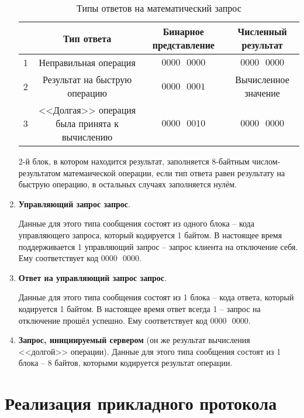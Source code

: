 \begin{enumerate}
	\begin{table}[H]
	\begin{center}
		\caption{Типы ответов на математический запрос}
		\label{tab:math-resp}
		\def\tabcolsep{4pt}
		\fontsize{10}{11}\selectfont
		\begin{tabular}{|c|c|c|c|}
			\hline 
			& Тип ответа & Бинарное представление & Численный результат \\ 
			\hline 
			1 & Неправильная операция & $0000\text{ }0000$ & $0000\text{ }0000$\\ 
			\hline 
			2 & Результат на быструю операцию & $0000\text{ }0001$ & Вычисленное значение\\ 
			\hline 
			3 & <<Долгая>> операция была принята к вычислению & $0000\text{ }0010$ & $0000\text{ }0000$\\ 
			\hline 
		\end{tabular} 
	\end{center}
	\end{table}	

	2-й блок, в котором находится результат, заполняется 8-байтным числом-результатом матемаической операции, если тип ответа равен результату на быструю операцию, в остальных случаях заполняется нулём.	
	
		\item \textbf{Управляющий запрос запрос}.
		
		Данные для этого типа сообщения состоят из одного блока -- кода управляющего запроса, который кодируется 1 байтом. В настоящее время поддерживается 1 управляющий запрос -- запрос клиента на отключение себя. Ему соответствует код $0000\text{ }0000$.
	
		\item \textbf{Ответ на управляющий запрос запрос}.
		
		Данные для этого типа сообщения состоят из 1 блока -- кода ответа, который кодируется 1 байтом. В настоящее время ответ всегда 1 -- запрос на отключение прошёл успешно. Ему соответствует код $0000\text{ }0000$.
		
		\item \textbf{Запрос, инициируемый сервером} (он же результат вычисления <<долгой>> операции). Данные для этого типа сообщения состоят из 1 блока -- 8 байтов, которыми кодируется результат операции.
	
\end{enumerate}

\section{Реализация прикладного протокола}

